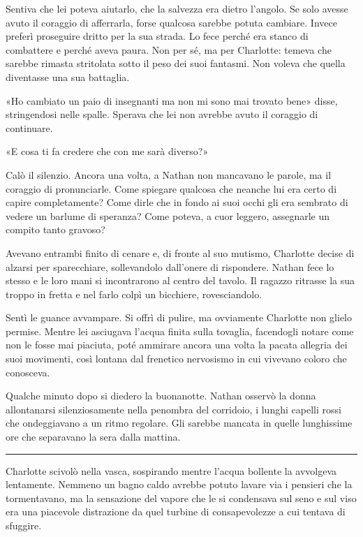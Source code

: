 \documentclass[a4paper,oneside,11pt]{memoir}
\begin{document}
Sentiva che lei poteva aiutarlo, che la salvezza era dietro l'angolo. Se solo avesse avuto il coraggio di afferrarla,
forse qualcosa sarebbe potuta cambiare. Invece preferì proseguire dritto per la sua strada. Lo fece perché era stanco
di combattere e perché aveva paura. Non per sé, ma per Charlotte: temeva che sarebbe rimasta stritolata sotto il peso
dei suoi fantasmi. Non voleva che quella diventasse una sua battaglia.

«Ho cambiato un paio di insegnanti ma non mi sono mai trovato bene» disse, stringendosi nelle spalle. Sperava che lei
non avrebbe avuto il coraggio di continuare.

«E cosa ti fa credere che con me sarà diverso?»

Calò il silenzio. Ancora una volta, a Nathan non mancavano le parole, ma il coraggio di pronunciarle. Come spiegare
qualcosa che neanche lui era certo di capire completamente? Come dirle che in fondo ai suoi occhi gli era sembrato di
vedere un barlume di speranza? Come poteva, a cuor leggero, assegnarle un compito tanto gravoso?

Avevano entrambi finito di cenare e, di fronte al suo mutismo, Charlotte decise di alzarsi per sparecchiare,
sollevandolo dall'onere di rispondere. Nathan fece lo stesso e le loro mani si incontrarono al centro del tavolo. Il
ragazzo ritrasse la sua troppo in fretta e nel farlo colpì un bicchiere, rovesciandolo.

Sentì le guance avvampare. Si offrì di pulire, ma ovviamente Charlotte non glielo permise. Mentre lei asciugava
l'acqua finita sulla tovaglia, facendogli notare come non le fosse mai piaciuta, poté ammirare ancora una volta la
pacata allegria dei suoi movimenti, così lontana dal frenetico nervosismo in cui vivevano coloro che conosceva.

Qualche minuto dopo si diedero la buonanotte. Nathan osservò la donna allontanarsi silenziosamente nella penombra del
corridoio, i lunghi capelli rossi che ondeggiavano a un ritmo regolare. Gli sarebbe mancata in quelle lunghissime ore
che separavano la sera dalla mattina.

\plainbreak{1}

Charlotte scivolò nella vasca, sospirando mentre l'acqua bollente la avvolgeva lentamente. Nemmeno un bagno caldo
avrebbe potuto lavare via i pensieri che la tormentavano, ma la sensazione del vapore che le si condensava sul seno e
sul viso era una piacevole distrazione da quel turbine di consapevolezze a cui tentava di sfuggire.
\end{document}
